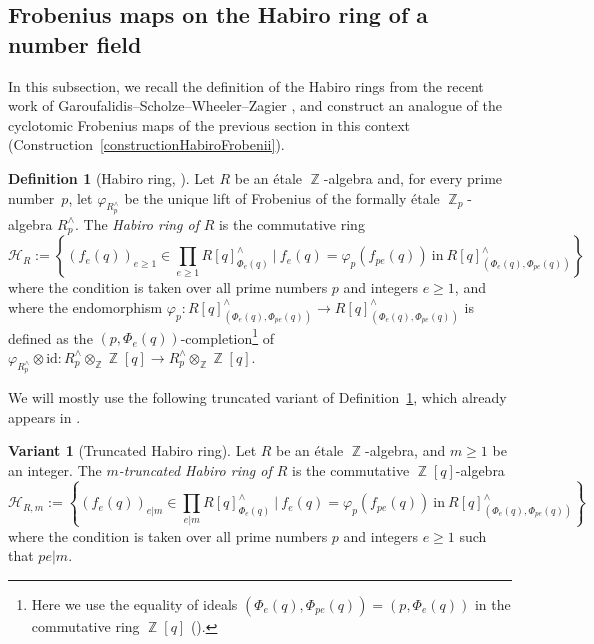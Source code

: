\documentclass[10pt,twoside]{scrarticle}
\theoremstyle{definition}
\newtheorem{definition}[theorem]{Definition}
\newtheorem{variant}[theorem]{Variant}
\DeclareMathOperator{\Z}{\mathbb{Z}}
\renewcommand{\ge}{\geqslant}
\renewcommand{\geq}{\geqslant}
\numberwithin{equation}{theorem}
\begin{document}
\subsection{Frobenius maps on the Habiro ring of a number field}\label{subsectionHabirorings}

In this subsection, we recall the definition of the Habiro rings from the recent work of Garoufalidis--Scholze--Wheeler--Zagier \cite{garoufalidis_habiro_2024}, and construct an analogue of the cyclotomic Frobenius maps of the previous section in this context (Construction~\ref{constructionHabiroFrobenii}).

\begin{definition}[Habiro ring, \cite{garoufalidis_habiro_2024,wagner_q-hodge_2025}]\label{def:habiro}
    Let $R$ be an étale $\Z$-algebra and, for every prime number~$p$, let $\varphi_{R^\wedge_p}$ be the unique lift of Frobenius of the formally étale $\Z_{p}$\nobreakdash-algebra $R^\wedge_{p}$. 
    The \emph{Habiro ring of} $R$ is the commutative ring
    \[
    \mathcal{H}_{R}:=\left\{(f_e(q))_{e \ge 1} \in \prod_{e \ge 1}{R[q]^\wedge_{\Phi_e(q)}}~\bigg |~f_e(q) = \varphi_p(f_{p e}(q))~\text{in}~R[q]^\wedge_{(\Phi_{e}(q),\Phi_{pe}(q))}\right\}
    \]
    where the condition is taken over all prime numbers $p$ and integers $e \ge 1$, and where the endomorphism $\varphi_{p} : R[q]^\wedge_{(\Phi_{e}(q),\Phi_{pe}(q))} \rightarrow R[q]^\wedge_{(\Phi_{e}(q),\Phi_{pe}(q))}$ is defined as the $(p,\Phi_e(q))$-completion\footnote{Here we use the equality of ideals $(\Phi_e(q),\Phi_{pe}(q)) = (p,\Phi_e(q))$ in the commutative ring $\Z[q]$ (\cite[Lemma~2.1]{wagner_q-witt_2024}).} of $\varphi_{R^\wedge_p} \otimes \text{id} : R^\wedge_p \otimes_{\Z} \Z[q] \rightarrow R^\wedge_p \otimes_{\Z} \Z[q]$.
\end{definition}

We will mostly use the following truncated variant of Definition~\ref{def:habiro}, which already appears in \cite[2.7]{wagner_q-hodge_2025}.

\begin{variant}[Truncated Habiro ring]\label{varianttruncatedHabiroring}
Let $R$ be an étale $\Z$-algebra, and $m\geq 1$ be an integer. The \emph{$m$-truncated Habiro ring of $R$} is the commutative $\Z[q]$-algebra 
\[
    \mathcal{H}_{R,m}:=\left\{(f_e(q))_{e|m} \in \prod_{e|m}{R[q]^\wedge_{\Phi_e(q)}}~\bigg |~f_e(q) = \varphi_p(f_{p e}(q))~\text{in}~R[q]^\wedge_{(\Phi_{e}(q),\Phi_{pe}(q))}\right\}
\]
where the condition is taken over all prime numbers $p$ and integers $e \ge 1$ such that $pe|m$. 
\end{variant}
\end{document}
